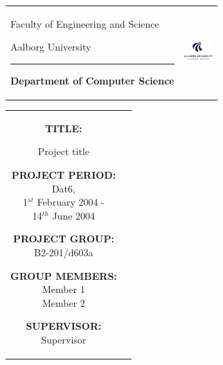 \begin{titlepage}

\thispagestyle{empty}

\begin{nopagebreak}
{\samepage

\begin{tabular}{lr}
        \parbox{14.5cm}{
          {\LARGE Faculty of Engineering and Science}

          {\small Aalborg University}
          \vspace{-0.3cm}\\
        \hrule
        \vspace{0.2cm}
          {\bf Department of Computer Science}
         }   & \hspace{-2.0cm} \includegraphics[width=1.1cm]{graphics/aau_logo_en}
\end{tabular}

\begin{tabular}{cc}
\parbox{7cm}{
\hspace{2cm}
\begin{description}

\item {\bf TITLE:}

Project title 


\end{description}

\parbox{8cm}{

\begin{description}
        \item {\bf PROJECT PERIOD:}\\
          Dat6, \\
          1$^{st}$ February 2004 -\\ 14$^{th}$ June 2004\\
          \hspace{4cm}
        \item {\bf PROJECT GROUP:}\\
          B2-201/d603a\\
          \hspace{4cm}
        \item {\bf GROUP MEMBERS:}\\
          Member 1 \\
          Member 2 
          \hspace{2cm}
        \item {\bf SUPERVISOR:}\\
          Supervisor
\end{description}
}

}
\end{tabular}}
\end{nopagebreak}
\end{titlepage}
